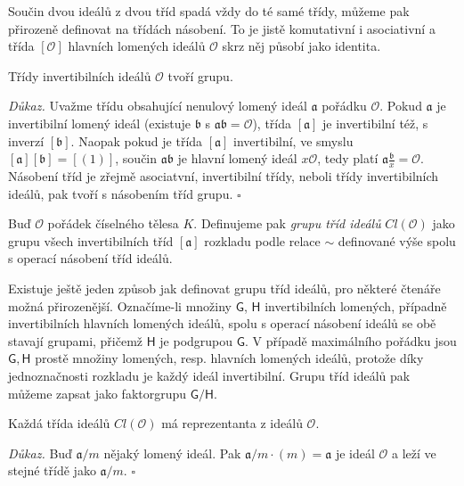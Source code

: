 \documentclass[12pt]{report}
\begin{document}
Součin dvou ideálů z dvou tříd spadá vždy do té samé třídy, můžeme pak přirozeně definovat na třídách násobení. To je jistě komutativní i asociativní a třída $[\mathcal{O}]$ hlavních lomených ideálů $\mathcal{O}$ skrz něj působí jako identita.

\begin{veta}
Třídy invertibilních ideálů $\mathcal{O}$ tvoří grupu.
\end{veta}
\noindent \textit{Důkaz.} Uvažme třídu obsahující nenulový lomený ideál $\mathfrak{a}$ pořádku $\mathcal{O}$. Pokud $\mathfrak{a}$ je invertibilní lomený ideál (existuje $\mathfrak{b}$ s $\mathfrak{ab} = \mathcal{O}$), třída $[\mathfrak{a}]$ je invertibilní též, s inverzí $[\mathfrak{b}]$. Naopak pokud je třída $[\mathfrak{a}]$ invertibilní, ve smyslu $[\mathfrak{a}][\mathfrak{b}] = [(1)]$, součin $\mathfrak{a}\mathfrak{b}$ je hlavní lomený ideál $x\mathcal{O}$, tedy platí $\mathfrak{a} \frac{\mathfrak{b}}{x} = \mathcal{O}$. Násobení tříd je zřejmě asociatvní, invertibilní třídy, neboli třídy invertibilních ideálů, pak tvoří s násobením tříd grupu. \hfill $\square$\\

\begin{definice}
Buď $\mathcal{O}$ pořádek číselného tělesa $K$. Definujeme pak \textit{grupu tříd ideálů} $Cl(\mathcal{O})$ jako grupu všech invertibilních tříd $[\mathfrak{a}]$ rozkladu podle relace $\sim$ definované výše spolu s operací násobení tříd ideálů.
\end{definice}

Existuje ještě jeden způsob jak definovat grupu tříd ideálů, pro některé čtenáře možná přirozenější. Označíme-li množiny $\mathsf{G}$, $\mathsf{H}$ invertibilních lomených, případně invertibilních hlavních lomených ideálů, spolu s operací násobení ideálů se obě stavají grupami, přičemž $\mathsf{H}$ je podgrupou $\mathsf{G}$. V případě maximálního pořádku jsou $\mathsf{G},\mathsf{H}$ prostě množiny lomených, resp. hlavních lomených ideálů, protože díky jednoznačnosti rozkladu je každý ideál invertibilní. Grupu tříd ideálů pak můžeme zapsat jako faktorgrupu $\mathsf{G}/\mathsf{H}$.

\begin{veta}
Každá třída ideálů $Cl (\mathcal{O})$ má reprezentanta z ideálů $\mathcal{O}$.
\end{veta}
\noindent \textit{Důkaz.} Buď $\mathfrak{a}/m$ nějaký lomený ideál. Pak $\mathfrak{a}/m \cdot (m) = \mathfrak{a}$ je ideál $\mathcal{O}$ a leží ve stejné třídě jako $\mathfrak{a}/m$. \hfill $\square$\\
\end{document}
